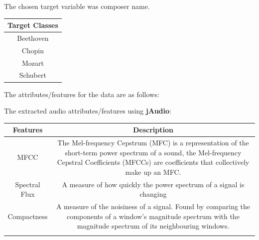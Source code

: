 \documentclass[11pt]{article}
\begin{document}
The chosen target variable was composer name.

\begin{longtable}[c]{@{}c@{}}
\toprule
Target Classes\tabularnewline
\midrule
\endhead
Beethoven\tabularnewline
Chopin\tabularnewline
Mozart\tabularnewline
Schubert\tabularnewline
\bottomrule
\end{longtable}

\newpage

The attributes/features for the data are as follows:

The extracted audio attributes/features using \textbf{jAudio}:

\begin{longtable}[c]{@{}cc@{}}
\toprule
\begin{minipage}[b]{0.15\columnwidth}\centering\strut
Features
\strut\end{minipage} &
\begin{minipage}[b]{0.79\columnwidth}\centering\strut
Description
\strut\end{minipage}\tabularnewline
\midrule
\endhead
\begin{minipage}[t]{0.15\columnwidth}\centering\strut
MFCC
\strut\end{minipage} &
\begin{minipage}[t]{0.79\columnwidth}\centering\strut
The Mel-frequency Cepstrum (MFC) is a representation of the short-term
power spectrum of a sound, the Mel-frequency Cepstral Coefficients
(MFCCs) are coefficients that collectively make up an MFC.
\strut\end{minipage}\tabularnewline
\begin{minipage}[t]{0.15\columnwidth}\centering\strut
Spectral Flux
\strut\end{minipage} &
\begin{minipage}[t]{0.79\columnwidth}\centering\strut
A measure of how quickly the power spectrum of a signal is changing
\strut\end{minipage}\tabularnewline
\begin{minipage}[t]{0.15\columnwidth}\centering\strut
Compactness
\strut\end{minipage} &
\begin{minipage}[t]{0.79\columnwidth}\centering\strut
A measure of the noisiness of a signal. Found by comparing the
components of a window's magnitude spectrum with the magnitude spectrum
of its neighbouring windows.
\strut\end{minipage}\tabularnewline
\begin{minipage}[t]{0.15\columnwidth}\centering\strut

\end{minipage}
\end{longtable}
\end{document}
